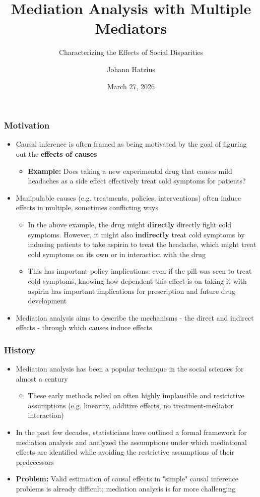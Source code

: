 \documentclass{beamer}
\title{Mediation Analysis with Multiple Mediators}
\subtitle{Characterizing the Effects of Social Disparities}
\author{Johann Hatzius}
\institute{Department of Statistics}
\date{March 27, 2026}
\begin{document}
\begin{frame}
\titlepage
\end{frame}

\begin{frame}
\frametitle{Motivation}
\begin{itemize}
\item Causal inference is often framed as being motivated by the goal of figuring out the \textbf{effects of causes}
\begin{itemize}
\item \textbf{Example:} Does taking a new experimental drug that causes mild headaches as a side effect effectively treat cold symptoms for patients?
\end{itemize}
\item Manipulable causes (e.g. treatments, policies, interventions) often induce effects in multiple, sometimes conflicting ways
\begin{itemize}
\item In the above example, the drug might \textbf{directly} directly fight cold symptoms. However, it might also \textbf{indirectly} treat cold symptoms by inducing patients to take aspirin to treat the headache, which might treat cold symptoms on its own or in interaction with the drug ~\citep{pearl2001}
\item This has important policy implications: even if the pill was seen to treat cold symptoms, knowing how dependent this effect is on taking it with aspirin has important implications for prescription and future drug development
\end{itemize}

\item Mediation analysis aims to describe the mechanisms - the direct and indirect effects - through which causes induce effects
\end{itemize}
\end{frame}

\begin{frame}
\frametitle{History}
\begin{itemize}
\item Mediation analysis has been a popular technique in the social sciences for almost a century ~\citep{wright1934, baronkenny1986}
\begin{itemize}
\item These early methods relied on often highly implausible and restrictive assumptions (e.g. linearity, additive effects, no treatment-mediator interaction) 
\end{itemize}
\item In the past few decades, statisticians have outlined a formal framework for mediation analysis and analyzed the assumptions under which mediational effects are identified while avoiding the restrictive assumptions of their predecessors ~\citep{robinsgreenland1992, pearl2001}
\item \textbf{Problem:} Valid estimation of causal effects in "simple" causal inference problems is already difficult; mediation analysis is far more challenging 
\end{itemize}
\end{frame}
\end{document}
